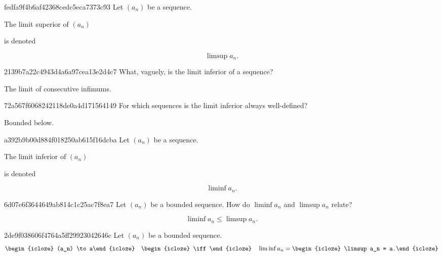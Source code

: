\begin{note}{fedfa9f4b6af42368cedc5eca7373c93}
    Let \({ (a_n) }\) be a sequence.
    \begin{icloze}{2}The limit superior of \({ (a_n) }\)\end{icloze} is denoted
    \begin{icloze}{1}
        \[
            \limsup a_n.
        \]
    \end{icloze}
\end{note}

\begin{note}{2139b7a22c4943d4a6a97cea13e2d4c7}
    What, vaguely, is the limit inferior of a sequence?

    \begin{cloze}{1}
        The limit of consecutive infimums.
    \end{cloze}
\end{note}

\begin{note}{72a567f6068242118de0a4d171564149}
    For which sequences is the limit inferior always well-defined?

    \begin{cloze}{1}
        Bounded below.
    \end{cloze}
\end{note}

\begin{note}{a392b9b00d884f018250ab615f16dcba}
    Let \({ (a_n) }\) be a sequence.
    \begin{icloze}{2}The limit inferior of \({ (a_n) }\)\end{icloze} is denoted
    \begin{icloze}{1}
        \[
            \liminf a_n.
        \]
    \end{icloze}
\end{note}

\begin{note}{6d07e6f3644649ab814c1c25ac7f8ea7}
    Let \({ (a_n) }\) be a bounded sequence.
    How do \({ \liminf a_n }\) and \({ \limsup a_n }\) relate?

    \begin{cloze}{1}
        \[
            \liminf a_n \leq \limsup a_n.
        \]
    \end{cloze}
\end{note}

\begin{note}{2de9f038606f4764a5ff29923042646c}
    Let \({ (a_n) }\) be a bounded sequence.
    \[
        \begin{icloze}{2}(a_n) \to a\end{icloze}
        \quad \begin{icloze}{3}\iff\end{icloze} \quad
        \liminf a_n = \begin{icloze}{1}\limsup a_n = a.\end{icloze}
    \]
\end{note}

